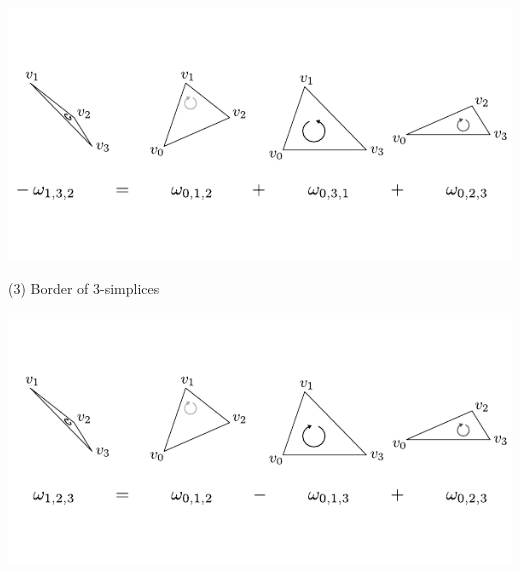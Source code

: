 \documentclass[compress]{beamer}
\begin{document}
\begin{frame}
\begin{center}
\begin{overprint}
      \includegraphics[scale=1.0]{../img/conditions/08.pdf}
    \end{overprint}
  \end{center}
\end{frame}
\begin{frame}{(3) Border of 3-simplices}
  \begin{center}
    \begin{overprint}
      \includegraphics[scale=1.0]{../img/conditions/09.pdf}
    \end{overprint}
  \end{center}
\end{frame}
\end{document}
